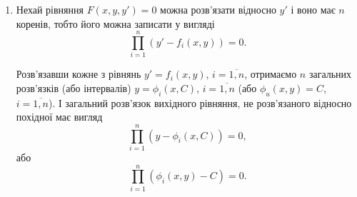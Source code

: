 \begin{enumerate}
	\item Нехай рівняння $F(x, y, y') = 0$ можна розв'язати відносно $y'$ і воно має $n$ коренів, тобто його можна записати у вигляді 
	\begin{equation*}
		\prod_{i=1}^n (y' - f_i(x, y)) = 0.
	\end{equation*}
	
	Розв'язавши кожне з рівнянь $y' = f_i(x, y)$, $i=\overline{1,n}$, отримаємо $n$ загальних розв'язків (або інтервалів) $y = \phi_i(x, C)$, $i=\overline{1,n}$ (або $\phi_u(x,y)=C$, $i=\overline{1,n}$). І загальний розв'язок вихідного рівняння, не розв'язаного відносно похідної має вигляд
	\begin{equation*}
		\prod_{i=1}^n (y - \phi_i(x, C)) = 0,
	\end{equation*}
	або
	\begin{equation*}
		\prod_{i=1}^n (\phi_i(x, y) - C) = 0.
	\end{equation*}
\end{enumerate}
